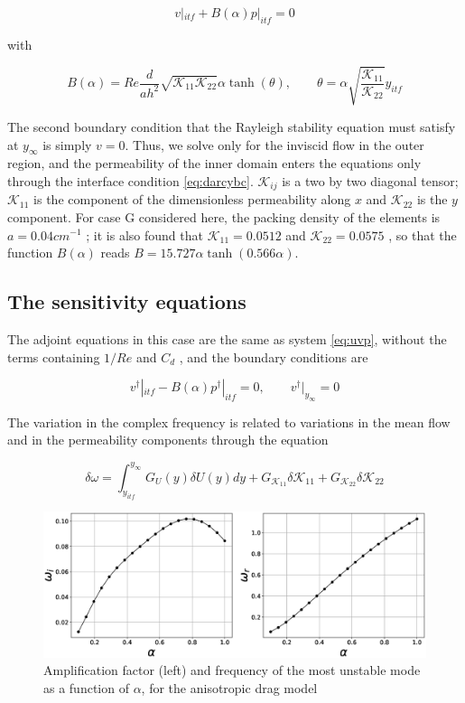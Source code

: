 \begin{equation}
v|_{itf} + B(\alpha) p|_{itf} = 0
\label{eq:darcybc}
\end{equation}

with

$$
B(\alpha) = Re \dfrac{d}{ah^2} \sqrt{\mathcal{K}_{11}\mathcal{K}_{22}} \alpha \tanh (\theta), \qquad \theta = \alpha \sqrt{\dfrac{\mathcal{K}_{11}}{\mathcal{K}_{22}}}  y_{itf}
$$

The second boundary condition that the Rayleigh stability equation must satisfy at $y_{\infty}$ is simply $v = 0$. Thus, we solve only for the inviscid flow in the outer region, and the permeability
of the inner domain enters the equations only through the interface condition \ref{eq:darcybc}. $\mathcal{K}_{ij}$ is a two by two diagonal tensor; $\mathcal{K}_{11}$ is the component of the dimensionless permeability along $x$ and
$\mathcal{K}_{22}$ is the $y$ component. For case G considered here, the packing density of the elements is
$a = 0.04 cm^{-1}$ ; it is also found that $\mathcal{K}_{11}= 0.0512$ and $\mathcal{K}_{22} = 0.0575$ \citet{zampognaprivate},  so that the function $B(\alpha)$
reads $B = 15.727 \alpha \tanh (0.566 \alpha)$.


\subsection{The sensitivity equations}

The adjoint equations in this case are the same as system \ref{eq:uvp}, without the terms containing $1/Re$
and $C_d$ , and the boundary conditions are

\begin{equation}
v^{\dagger}|_{itf} - B(\alpha) p^{\dagger}|_{itf} = 0, \qquad v^{\dagger}|_{y_{\infty}} = 0
\label{eq:darcybc_adjoint}
\end{equation}

The variation in the complex frequency is related to variations in the mean flow and in the permeability components through the equation

$$
\delta \omega = \int_{y_{itf}}^{y_{\infty}}  G_U(y) \delta U(y) dy + G_{\mathcal{K}_{11}} \delta \mathcal{K}_{11} + G_{\mathcal{K}_{22}} \delta \mathcal{K}_{22}
$$

\begin{figure}[H]
	\centering
	\includegraphics[width=1\linewidth]{chapter_3/figure/6}
	\caption{Amplification factor (left) and frequency of the most unstable mode as a function of $\alpha$, for the anisotropic drag
		model}
	\label{fig:6}
\end{figure}



